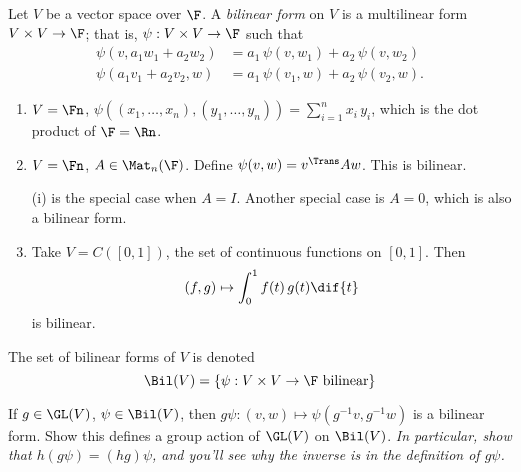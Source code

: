 \setcounter{lecture}{5}

\begin{definition}
	Let $V$ be a vector space over $\F$. A \emph{bilinear form} on $V$ is a multilinear form $V\times V\to\F$; that is, $\psi:V\times V\to\F$ such that %
	\begin{align*}
		\psi(v, a_1 w_1 + a_2 w_2) &= a_1\,\psi(v,w_1) + a_2\,\psi(v,w_2) \\
		\psi(a_1 v_1 + a_2 v_2, w) &= a_1\,\psi(v_1,w) + a_2\,\psi(v_2,w).
	\end{align*}
\end{definition}

\begin{examples}
\mbox{}
\begin{enumerate}
	\item $V=\Fn$, $\psi\left( (x_1,\ldots,x_n),(y_1,\ldots,y_n) \right) = \sum_{i=1}^n x_i\,y_i$, which is the dot product of $\F=\Rn$. %
	\item $V=\Fn$, $A\in\Mat_n(\F)$. Define $\psi(v,w)=v^\Trans Aw$. This is bilinear.
	
	(i) is the special case when $A=I$. Another special case is $A=0$, which is also a bilinear form. %
	\item Take $V=C([0,1])$, the set of continuous functions on $[0,1]$. Then
	\begin{equation*}
		(f,g) \mapsto \int_0^1 f(t)\,g(t) \dif{t}
	\end{equation*}
	is bilinear.
\end{enumerate}
\end{examples}

\begin{definition}
	The set of bilinear forms of $V$ is denoted %
	\begin{equation*}
		\Bil(V) = \left\{\psi:V\times V\to\F \text{ bilinear}\right\}
	\end{equation*}
\end{definition}

\begin{exercise}
	If $g\in\GL(V)$, $\psi\in\Bil(V)$, then $g\psi:(v,w) \mapsto \psi(g^{-1} v, g^{-1} w)$ is a bilinear form. Show this defines a group action of $\GL(V)$ on $\Bil(V)$. %
	\emph{In particular, show that $h(g\psi) = (hg)\psi$, and you'll see why the inverse is in the definition of $g\psi$.}
\end{exercise}

